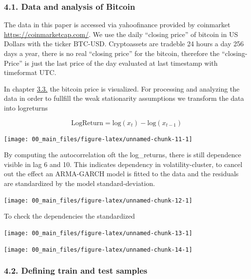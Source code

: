 \documentclass[
]{article}
\begin{document}
\hypertarget{data-and-analysis-of-bitcoin}{%
\subsubsection{4.1. Data and analysis of
Bitcoin}\label{data-and-analysis-of-bitcoin}}

The data in this paper is accessed via yahoofinance provided by
coinmarket \url{https://coinmarketcap.com/}. We use the daily ``closing
price'' of bitcoin in US Dollars with the ticker BTC-USD. Cryptoassets
are tradeble 24 hours a day 256 days a year, there is no real ``closing
price'' for the bitcoin, therefore the ``closing-Price'' is just the
last price of the day evaluated at last timestamp with timeformat UTC.

In chapter \protect\hyperlink{bitcoin}{3.3.} the bitcoin price is
visualized. For processing and analyzing the data in order to fullfill
the weak stationarity assumptions we transform the data into logreturns

\[\mathrm{LogReturn} = \mathrm{log}(x_{t})-\mathrm{log}(x_{t-1})\]

\begin{center}\texttt{[image: 00\_main\_files/figure-latex/unnamed-chunk-11-1]} \end{center}

By computing the autocorrelation oft the log\_returns, there is still
dependence visible in lag 6 and 10. This indicates dependency in
volatility-cluster, to cancel out the effect an ARMA-GARCH model is
fitted to the data and the residuals are standardized by the model
standard-deviation.

\begin{center}\texttt{[image: 00\_main\_files/figure-latex/unnamed-chunk-12-1]} \end{center}

To check the dependencies the standardized

\begin{center}\texttt{[image: 00\_main\_files/figure-latex/unnamed-chunk-13-1]} \end{center}

\begin{center}\texttt{[image: 00\_main\_files/figure-latex/unnamed-chunk-14-1]} \end{center}

\hypertarget{defining-train-and-test-samples}{%
\subsubsection{4.2. Defining train and test
samples}\label{defining-train-and-test-samples}}
\end{document}
